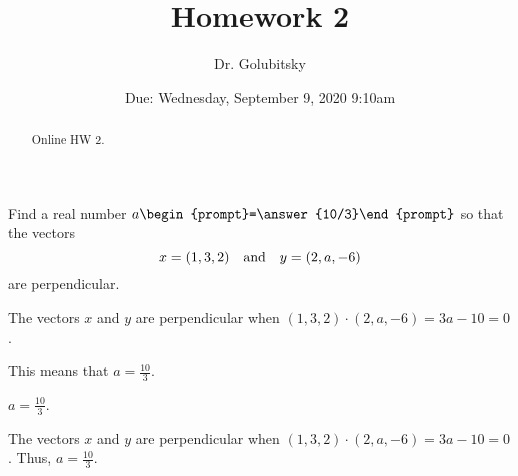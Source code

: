 \documentclass{ximera}
\title{Homework 2}
\author{Dr. Golubitsky}
\date{Due: Wednesday, September 9, 2020 \@9:10am}
\begin{document}
\begin{abstract}
Online HW 2.
\end{abstract}
\maketitle


\problemlabel



\begin{exercise} \label{c1.4.2}
Find a real number $a\begin{prompt}=\answer{10/3}\end{prompt}$ so that the vectors
\[
x = (1,3,2) \quad\mbox{and}\quad y = (2,a,-6)
\]
are perpendicular.
\begin{hint}
  The vectors $x$ and $y$ are perpendicular when
$(1,3,2) \cdot (2,a,-6) = 3a - 10 = 0$.
\end{hint}
\begin{hint}
  This means that $a = \frac{10}{3}$.
\end{hint}

\begin{solution}
\ans $a = \frac{10}{3}$.

\soln The vectors $x$ and $y$ are perpendicular when $(1,3,2) \cdot (2,a,-6) = 3a - 10 = 0$.  Thus, $a = \frac{10}{3}$.

\end{solution}
\end{exercise}




\problemlabel
\end{document}
